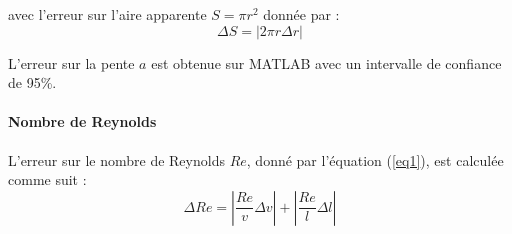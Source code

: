 \documentclass[a4paper, 12pt,oneside]{article}
\begin{document}
avec l'erreur sur l'aire apparente $S = \pi r^2$ donnée par :
\begin{equation}
    \Delta S = \left| 2\pi r \Delta r \right|
\end{equation}

L'erreur sur la pente $a$ est obtenue sur MATLAB avec un intervalle de confiance de 95\%.

\paragraph{Nombre de Reynolds}

L'erreur sur le nombre de Reynolds $Re$, donné par l'équation (\ref{eq1}), est calculée comme suit :
\begin{equation}
    \Delta Re = \left| \frac{Re}{v} \Delta v \right| + \left| \frac{Re}{l} \Delta l \right|
\end{equation}
\end{document}

